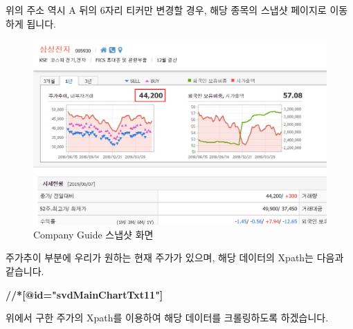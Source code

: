 \documentclass[12pt,]{book}
\newenvironment{Shaded}{\begin{snugshade}}{\end{snugshade}}
\newcommand{\DataTypeTok}[1]{\textcolor[rgb]{0.13,0.29,0.53}{#1}}
\newcommand{\ErrorTok}[1]{\textcolor[rgb]{0.64,0.00,0.00}{\textbf{#1}}}
\newcommand{\KeywordTok}[1]{\textcolor[rgb]{0.13,0.29,0.53}{\textbf{#1}}}
\newcommand{\NormalTok}[1]{#1}
\newcommand{\OperatorTok}[1]{\textcolor[rgb]{0.81,0.36,0.00}{\textbf{#1}}}
\newcommand{\StringTok}[1]{\textcolor[rgb]{0.31,0.60,0.02}{#1}}
\begin{document}
위의 주소 역시 A 뒤의 6자리 티커만 변경할 경우, 해당 종목의 스냅샷 페이지로 이동하게 됩니다.

\begin{figure}[h]

{\centering \includegraphics[width=0.7\linewidth]{images/crawl_practice_comp_price} 

}

\caption{Company Guide 스냅샷 화면}\label{fig:unnamed-chunk-20}
\end{figure}

주가추이 부분에 우리가 원하는 현재 주가가 있으며, 해당 데이터의 Xpath는 다음과 같습니다.

\begin{Shaded}
\begin{Highlighting}[]
\ErrorTok{//*[@id="svdMainChartTxt11"]}
\end{Highlighting}
\end{Shaded}

위에서 구한 주가의 Xpath를 이용하여 해당 데이터를 크롤링하도록 하겠습니다.

\begin{Shaded}
\end{Shaded}
\end{document}
